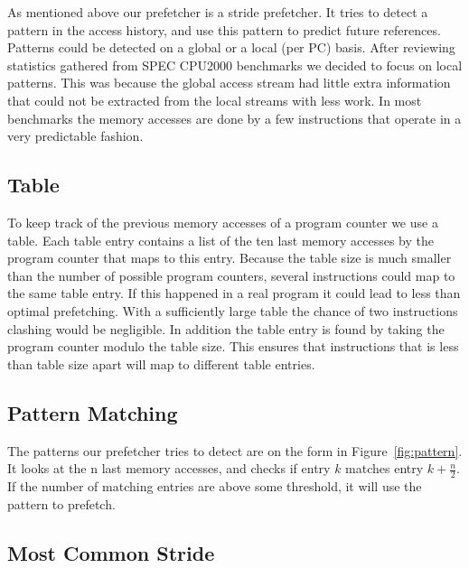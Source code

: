 As mentioned above our prefetcher is a stride prefetcher. It tries to detect a
pattern in the access history, and use this pattern to predict future
references. Patterns could be detected on a global or a local (per PC) basis.
After reviewing statistics gathered from SPEC CPU2000 benchmarks we decided to
focus on local patterns. This was because the global access stream had little
extra information that could not be extracted from the local streams with less
work. In most benchmarks the memory accesses are done by a few instructions
that operate in a very predictable fashion.

\subsection{Table}

To keep track of the previous memory accesses of a program counter we use a
table. Each table entry contains a list of the ten last memory accesses by the
program counter that maps to this entry. Because the table size is much smaller
than the number of possible program counters, several instructions could map to
the same table entry. If this happened in a real program it could lead to less
than optimal prefetching. With a sufficiently large table the chance of two
instructions clashing would be negligible. In addition the table entry is found
by taking the program counter modulo the table size. This ensures that
instructions that is less than table size apart will map to different table
entries.

\subsection{Pattern Matching}

The patterns our prefetcher tries to detect are on the form in
Figure~\ref{fig:pattern}. It looks at the n last memory accesses, and checks if
entry $k$ matches entry $k + \frac{n}{2}$. If the number of matching entries
are above some threshold, it will use the pattern to prefetch.

\subsection{Most Common Stride}

